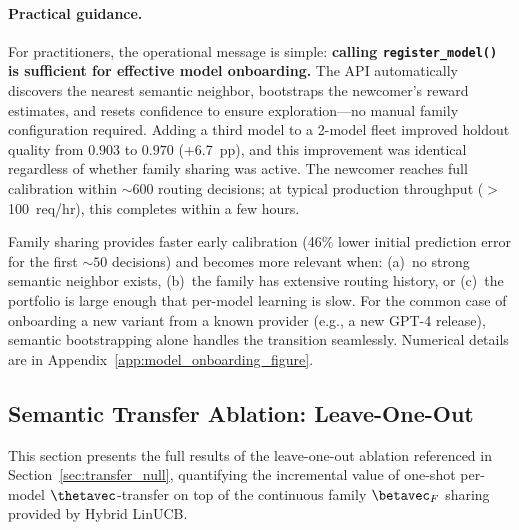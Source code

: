 \paragraph{Practical guidance.}
For practitioners, the operational message is simple: \textbf{calling \texttt{register\_model()} is sufficient for effective model onboarding.}  The API automatically discovers the nearest semantic neighbor, bootstraps the newcomer's reward estimates, and resets confidence to ensure exploration---no manual family configuration required.  Adding a third model to a 2-model fleet improved holdout quality from $0.903$ to $0.970$ (+6.7~pp), and this improvement was identical regardless of whether family sharing was active.  The newcomer reaches full calibration within ${\sim}600$ routing decisions; at typical production throughput ($>$100~req/hr), this completes within a few hours.

Family sharing provides faster early calibration (46\% lower initial prediction error for the first ${\sim}50$ decisions) and becomes more relevant when: (a)~no strong semantic neighbor exists, (b)~the family has extensive routing history, or (c)~the portfolio is large enough that per-model learning is slow. For the common case of onboarding a new variant from a known provider (e.g., a new GPT-4 release), semantic bootstrapping alone handles the transition seamlessly. Numerical details are in Appendix~\ref{app:model_onboarding_figure}.


\subsection{Semantic Transfer Ablation: Leave-One-Out}
\label{app:semantic_transfer_ablation}

This section presents the full results of the leave-one-out ablation
referenced in Section~\ref{sec:transfer_null}, quantifying the incremental
value of one-shot per-model $\thetavec$-transfer on top of the continuous
family $\betavec_F$ sharing provided by Hybrid LinUCB.

